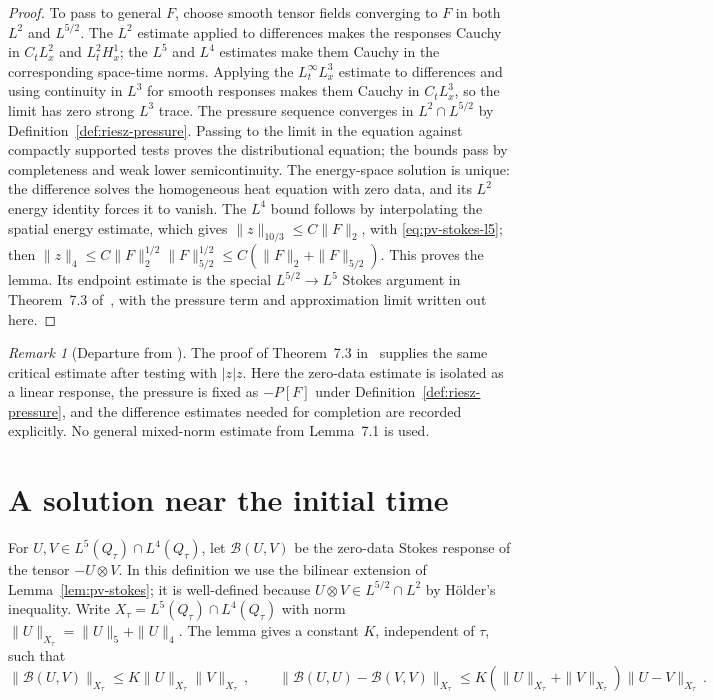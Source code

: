 \documentclass[11pt,letterpaper]{article}
\numberwithin{equation}{section}
\theoremstyle{plain}
\theoremstyle{definition}
\theoremstyle{remark}
\newtheorem{remark}[theorem]{Remark}
\begin{document}
\begin{proof}
To pass to general $F$, choose smooth tensor fields converging to $F$ in both $L^2$ and $L^{5/2}$. The $L^2$ estimate applied to differences makes the responses Cauchy in $C_tL^2_x$ and $L^2_tH^1_x$; the $L^5$ and $L^4$ estimates make them Cauchy in the corresponding space-time norms. Applying the $L^\infty_tL^3_x$ estimate to differences and using continuity in $L^3$ for smooth responses makes them Cauchy in $C_tL^3_x$, so the limit has zero strong $L^3$ trace. The pressure sequence converges in $L^2\cap L^{5/2}$ by Definition~\ref{def:riesz-pressure}. Passing to the limit in the equation against compactly supported tests proves the distributional equation; the bounds pass by completeness and weak lower semicontinuity. The energy-space solution is unique: the difference solves the homogeneous heat equation with zero data, and its $L^2$ energy identity forces it to vanish. The $L^4$ bound follows by interpolating the spatial energy estimate, which gives $\|z\|_{10/3}\le C\|F\|_2$, with \eqref{eq:pv-stokes-l5}; then $\|z\|_4\le C\|F\|_2^{1/2}\|F\|_{5/2}^{1/2}\le C(\|F\|_2+\|F\|_{5/2})$. This proves the lemma. Its endpoint estimate is the special $L^{5/2}\to L^5$ Stokes argument in Theorem~7.3 of~\cite[printed pp.~244--246]{ESS2003}, with the pressure term and approximation limit written out here.
\end{proof}

\begin{remark}[Departure from \cite{ESS2003}]\label{rem:pv-stokes-departure}
The proof of Theorem~7.3 in~\cite[printed pp.~244--246]{ESS2003} supplies the same critical estimate after testing with $|z|z$. Here the zero-data estimate is isolated as a linear response, the pressure is fixed as $-P[F]$ under Definition~\ref{def:riesz-pressure}, and the difference estimates needed for completion are recorded explicitly. No general mixed-norm estimate from Lemma~7.1 is used.
\end{remark}

\section{A solution near the initial time}\label{sec:pv-local}

For $U,V\in L^5(Q_\tau)\cap L^4(Q_\tau)$, let $\mathcal B(U,V)$ be the zero-data Stokes response of the tensor $-U\otimes V$. In this definition we use the bilinear extension of Lemma~\ref{lem:pv-stokes}; it is well-defined because $U\otimes V\in L^{5/2}\cap L^2$ by H\"older's inequality. Write $X_\tau=L^5(Q_\tau)\cap L^4(Q_\tau)$ with norm $\|U\|_{X_\tau}=\|U\|_5+\|U\|_4$. The lemma gives a constant $K$, independent of $\tau$, such that
\begin{equation}\label{eq:pv-bilinear}
 \|\mathcal B(U,V)\|_{X_\tau}\le K\|U\|_{X_\tau}\|V\|_{X_\tau}\,,\qquad
 \|\mathcal B(U,U)-\mathcal B(V,V)\|_{X_\tau}\le K(\|U\|_{X_\tau}+\|V\|_{X_\tau})\|U-V\|_{X_\tau}\,.
\end{equation}
\end{document}

